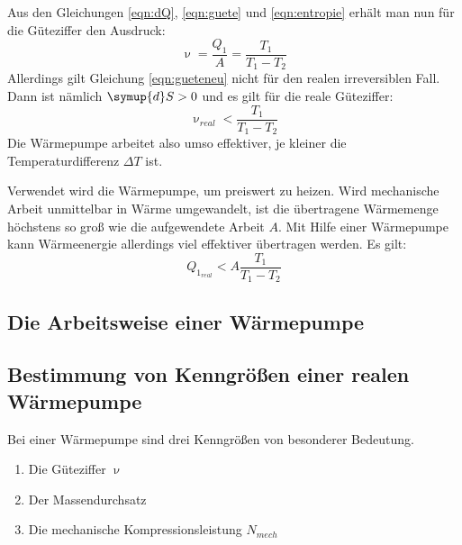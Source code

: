 Aus den Gleichungen \eqref{eqn:dQ}, \eqref{eqn:guete} und \eqref{eqn:entropie} erhält man nun für die Güteziffer den Ausdruck:
\begin{equation}
	\label{eqn:gueteneu}
	\upnu = \frac{Q_1}{A} = \frac{T_1}{T_1 - T_2}
\end{equation}
Allerdings gilt Gleichung \eqref{eqn:gueteneu} nicht für den realen irreversiblen Fall.
Dann ist nämlich $\symup{d}S > 0$ und es gilt für die reale Güteziffer:
\begin{equation}
	\upnu_{real} < \frac{T_1}{T_1 - T_2}
\end{equation}
Die Wärmepumpe arbeitet also umso effektiver, je kleiner die Temperaturdifferenz $\Delta T$ ist.

Verwendet wird die Wärmepumpe, um preiswert zu heizen.
Wird mechanische Arbeit unmittelbar in Wärme umgewandelt, ist die übertragene Wärmemenge höchstens so groß wie die aufgewendete Arbeit $A$.
Mit Hilfe einer Wärmepumpe kann Wärmeenergie allerdings viel effektiver übertragen werden. Es gilt:
\begin{equation}
	Q_{1_{real}} < A \frac{T_1}{T_1 - T_2}
\end{equation}

\newpage %
\subsection{Die Arbeitsweise einer Wärmepumpe}




\subsection{Bestimmung von Kenngrößen einer realen Wärmepumpe}

Bei einer Wärmepumpe sind drei Kenngrößen von besonderer Bedeutung.
\begin{enumerate}
		\item Die Güteziffer $\upnu$
		\item Der Massendurchsatz
		\item Die mechanische Kompressionsleistung $N_{mech}$
\end{enumerate}



